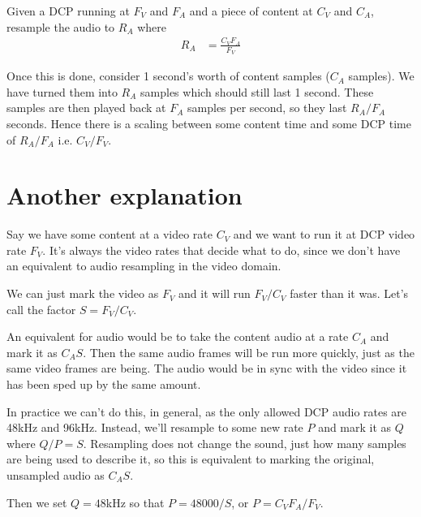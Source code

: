 \documentclass{article}
\begin{document}
Given a DCP running at $F_V$ and $F_A$ and a piece of content at $C_V$
and $C_A$, resample the audio to $R_A$ where
\begin{align*}
R_A &= \frac{C_V F_A}{F_V}
\end{align*}

Once this is done, consider 1 second's worth of content samples ($C_A$
samples).  We have turned them into $R_A$ samples which should still
last 1 second.  These samples are then played back at $F_A$ samples
per second, so they last $R_A / F_A$ seconds.  Hence there is a
scaling between some content time and some DCP time of $R_A / F_A$
i.e. $C_V / F_V$.


\section{Another explanation}

Say we have some content at a video rate $C_V$ and we want to
run it at DCP video rate $F_V$.  It's always the video rates that
decide what to do, since we don't have an equivalent to audio
resampling in the video domain.

We can just mark the video as $F_V$ and it will run $F_V / C_V$ faster
than it was.  Let's call the factor $S = F_V / C_V$.

An equivalent for audio would be to take the content audio at a rate
$C_A$ and mark it as $C_A S$.  Then the same audio frames will be run
more quickly, just as the same video frames are being.  The audio would be
in sync with the video since it has been sped up by the same amount.

In practice we can't do this, in general, as the only allowed DCP
audio rates are 48kHz and 96kHz.  Instead, we'll resample to some new
rate $P$ and mark it as $Q$ where $Q / P = S$.  Resampling does not
change the sound, just how many samples are being used to describe it,
so this is equivalent to marking the original, unsampled audio as $C_A S$.

Then we set $Q = 48$kHz so that $P = 48000 / S$, or $P = C_V F_A
/ F_V$.
\end{document}

